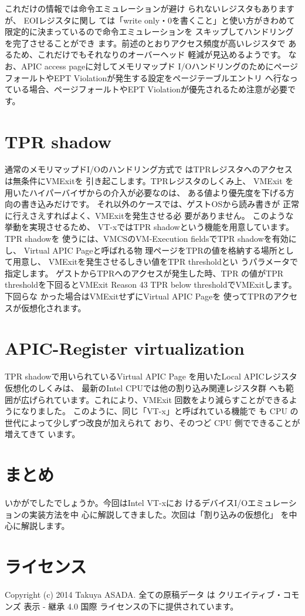 
 これだけの情報では命令エミュレーションが避け
られないレジスタもありますが、 EOIレジスタに関し
ては「write only・0を書くこと」と使い方がきわめて
限定的に決まっているので命令エミュレーションを
スキップしてハンドリングを完了させることができ
ます。前述のとおりアクセス頻度が高いレジスタで
あるため、これだけでもそれなりのオーバーヘッド
軽減が見込めるようです。
 なお、APIC access pageに対してメモリマップド
I/OハンドリングのためにページフォールトやEPT
Violationが発生する設定をページテーブルエントリ
へ行なっている場合、ページフォールトやEPT
Violationが優先されるため注意が必要です。

\section{TPR shadow}

 通常のメモリマップドI/Oのハンドリング方式で
はTPRレジスタへのアクセスは無条件にVMExitを
引き起こします。TPRレジスタのしくみ上、 VMExit
を用いたハイパーバイザからの介入が必要なのは、
ある値より優先度を下げる方向の書き込みだけです。
それ以外のケースでは、ゲストOSから読み書きが
正常に行えさえすればよく、VMExitを発生させる必
要がありません。
 このような挙動を実現させるため、 VT-xではTPR
shadowという機能を用意しています。 TPR shadowを
使うには、VMCSのVM-Execution fieldsでTPR
shadowを有効にし、 Virtual APIC Pageと呼ばれる物
理ページをTPRの値を格納する場所として用意し、
VMExitを発生させるしきい値をTPR thresholdとい
うパラメータで指定します。
 ゲストからTPRへのアクセスが発生した時、TPR
の値がTPR thresholdを下回るとVMExit Reason 43
TPR below thresholdでVMExitします。下回らな
かった場合はVMExitせずにVirtual APIC Pageを
使ってTPRのアクセスが仮想化されます。

\section{APIC-Register virtualization}

 TPR shadowで用いられているVirtual APIC Page
を用いたLocal APICレジスタ仮想化のしくみは、
最新のIntel CPUでは他の割り込み関連レジスタ群
へも範囲が広げられています。これにより、VMExit
回数をより減らすことができるようになりました。
 このように、同じ「VT-x」と呼ばれている機能で
も CPU の世代によって少しずつ改良が加えられて
おり、そのつど CPU 側でできることが増えてきて
います。


\section{まとめ}

 いかがでしたでしょうか。今回はIntel VT-xにお
けるデバイスI/Oエミュレーションの実装方法を中
心に解説してきました。次回は「割り込みの仮想化」
を中心に解説します。

\section{ライセンス}
Copyright (c) 2014 Takuya ASADA.
全ての原稿データ は クリエイティブ・コモンズ 表示 - 継承 4.0 国際 ライセンスの下に提供されています。



